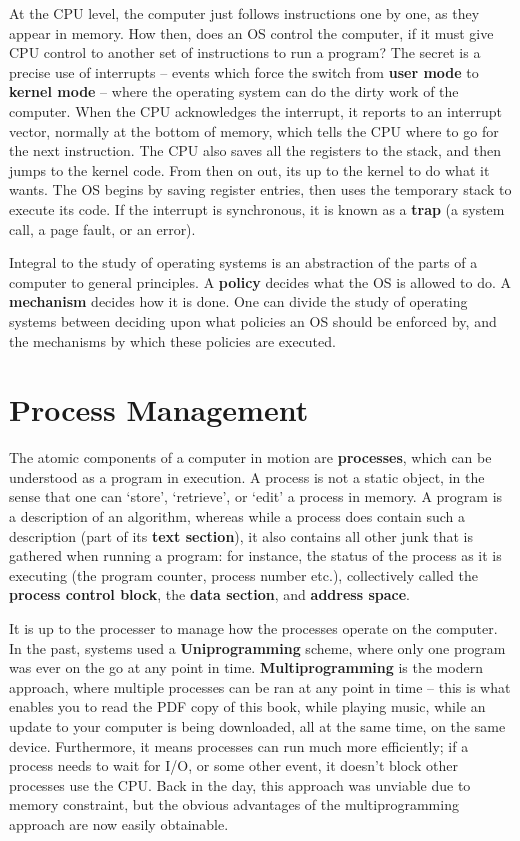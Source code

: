 At the CPU level, the computer just follows instructions one by one, as they appear in memory. How then, does an OS control the computer, if it must give CPU control to another set of instructions to run a program? The secret is a precise use of interrupts -- events which force the switch from {\bf user mode} to {\bf kernel mode} -- where the operating system can do the dirty work of the computer. When the CPU acknowledges the interrupt, it reports to an interrupt vector, normally at the bottom of memory, which tells the CPU where to go for the next instruction. The CPU also saves all the registers to the stack, and then jumps to the kernel code. From then on out, its up to the kernel to do what it wants. The OS begins by saving register entries, then uses the temporary stack to execute its code. If the interrupt is synchronous, it is known as a {\bf trap} (a system call, a page fault, or an error).

Integral to the study of operating systems is an abstraction of the parts of a computer to general principles. A {\bf policy} decides what the OS is allowed to do. A {\bf mechanism} decides how it is done. One can divide the study of operating systems between deciding upon what policies an OS should be enforced by, and the mechanisms by which these policies are executed.

\chapter{Process Management}

The atomic components of a computer in motion are {\bf processes}, which can be understood as a program in execution. A process is not a static object, in the sense that one can `store', `retrieve', or `edit' a process in memory. A program is a description of an algorithm, whereas while a process does contain such a description (part of its {\bf text section}), it also contains all other junk that is gathered when running a program: for instance, the status of the process as it is executing (the program counter, process number etc.), collectively called the {\bf process control block}, the {\bf data section}, and {\bf address space}.

It is up to the processer to manage how the processes operate on the computer. In the past, systems used a {\bf Uniprogramming} scheme, where only one program was ever on the go at any point in time. {\bf Multiprogramming} is the modern approach, where multiple processes can be ran at any point in time -- this is what enables you to read the PDF copy of this book, while playing music, while an update to your computer is being downloaded, all at the same time, on the same device. Furthermore, it means processes can run much more efficiently; if a process needs to wait for I/O, or some other event, it doesn't block other processes use the CPU. Back in the day, this approach was unviable due to memory constraint, but the obvious advantages of the multiprogramming approach are now easily obtainable.

